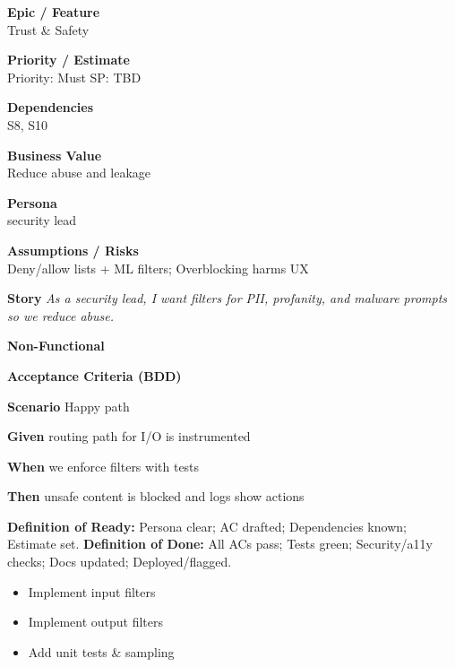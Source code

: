 \documentclass[11pt,a4paper]{article}
\newenvironment{StoryCard}[2][]{
  \begin{tcolorbox}[enhanced, breakable, sharp corners=all, colback=cardback, colframe=cardframe,
    title={#2}, fonttitle=\bfseries\large, boxrule=0.6pt, borderline west={2pt}{0pt}{accent}, #1]
}{
  \end{tcolorbox}
}
\newcommand{\badge}[1]{\pill{\footnotesize #1}}
\newcommand{\cb}{\(\square\)}
\newenvironment{TasksBox}[1][Tasks]{%
  \begin{tcolorbox}[enhanced,breakable,
    colback=cardback, colframe=cardframe, title={#1},
    borderline west={1.8pt}{0pt}{MidnightBlue},
    arc=2pt, boxrule=0.4pt,
    left=10pt,right=10pt,top=6pt,bottom=6pt,
    before skip=6pt, after skip=10pt
  ]
  \small
  \begin{itemize}[label=\cb, leftmargin=*, labelsep=0.6em, itemsep=4pt, topsep=2pt, parsep=0pt]
}{%
  \end{itemize}
  \end{tcolorbox}
}
\begin{document}
\begin{StoryCard}{S11 — Input/output filtering}
\noindent\begin{minipage}[t]{0.49\textwidth}
\textbf{Epic / Feature}\\
Trust \& Safety

\medskip
\textbf{Priority / Estimate}\\
Priority: Must \quad SP: TBD

\medskip
\textbf{Dependencies}\\
S8, S10
\end{minipage}\hfill
\begin{minipage}[t]{0.49\textwidth}
\textbf{Business Value}\\
Reduce abuse and leakage

\medskip
\textbf{Persona}\\
security lead

\medskip
\textbf{Assumptions / Risks}\\
Deny/allow lists + ML filters; Overblocking harms UX
\end{minipage}

\medskip
\textbf{Story} \emph{As a security lead, I want filters for PII, profanity, and malware prompts so we reduce abuse.}

\medskip
\textbf{Non-Functional}
\badge{Security}\ \badge{Privacy}

\medskip
\textbf{Acceptance Criteria (BDD)}\par
\textbf{Scenario} Happy path\par
\textbf{Given} routing path for I/O is instrumented\par
\textbf{When} we enforce filters with tests\par
\textbf{Then} unsafe content is blocked and logs show actions\par
\medskip
\footnotesize \textbf{Definition of Ready:} Persona clear; AC drafted; Dependencies known; Estimate set.\quad
\textbf{Definition of Done:} All ACs pass; Tests green; Security/a11y checks; Docs updated; Deployed/flagged.
\end{StoryCard}

\begin{TasksBox}[Tasks]
  \item Implement input filters
  \item Implement output filters
  \item Add unit tests \& sampling
\end{TasksBox}
\clearpage
\end{document}
